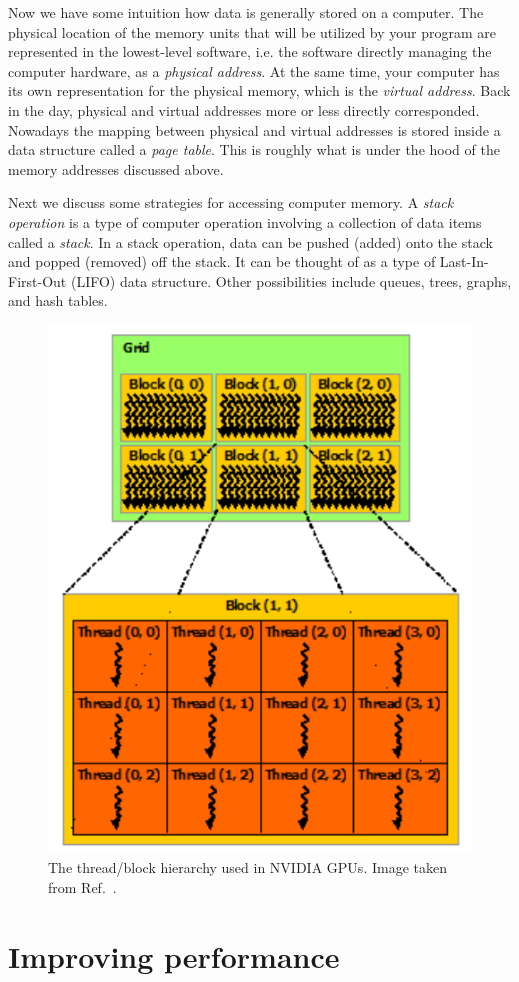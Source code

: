 Now we have some intuition how data is generally stored on a computer.
The physical location of the memory units that will be utilized by your
program are represented in the lowest-level software, i.e. the software
directly managing the computer hardware, as a {\it physical address}.
At the same time, your computer has its own representation for the physical
memory, which is the {\it virtual address}.
Back in the day, physical and virtual addresses more or less directly corresponded.
Nowadays the mapping between physical and virtual addresses is stored inside a
data structure called a {\it page table}.
This is roughly what is under the hood of the memory
addresses discussed above.

Next we discuss some strategies for accessing computer memory.
A {\it stack operation} is a type of computer operation involving a 
collection of data items called a {\it stack}. In a stack operation, data can be 
pushed (added) onto the stack and popped (removed) off the stack. It can be thought 
of as a type of Last-In-First-Out (LIFO) data structure.
Other possibilities include queues, trees, graphs, and hash tables.


\begin{figure}
\centering
\includegraphics[width=0.6\linewidth]{figs/threadBlock.pdf}
\caption{The thread/block hierarchy used in NVIDIA GPUs.
Image taken from Ref.~\cite{NVIDIA}.}
\label{fig:threadBlock}
\end{figure}


\section{Improving performance}


